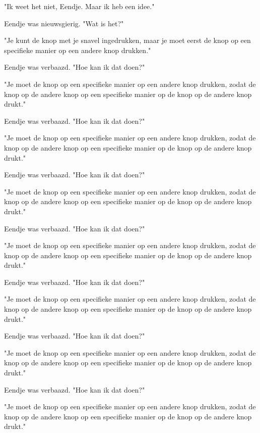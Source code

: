 \documentclass[10pt]{article}
\begin{document}
{\begin{minipage}{\textwidth}
\par\smallskip
"Ik weet het niet, Eendje. Maar ik heb een idee."
\par\smallskip
Eendje was nieuwsgierig. "Wat is het?"
\par\smallskip
"Je kunt de knop met je snavel ingedrukken, maar je moet eerst de knop op een specifieke manier op een andere knop drukken."
\par\smallskip
Eendje was verbaazd. "Hoe kan ik dat doen?"
\par\smallskip
"Je moet de knop op een specifieke manier op een andere knop drukken, zodat de knop op de andere knop op een specifieke manier op de knop op de andere knop drukt."
\par\smallskip
Eendje was verbaazd. "Hoe kan ik dat doen?"
\par\smallskip
"Je moet de knop op een specifieke manier op een andere knop drukken, zodat de knop op de andere knop op een specifieke manier op de knop op de andere knop drukt."
\par\smallskip
Eendje was verbaazd. "Hoe kan ik dat doen?"
\par\smallskip
"Je moet de knop op een specifieke manier op een andere knop drukken, zodat de knop op de andere knop op een specifieke manier op de knop op de andere knop drukt."
\par\smallskip
Eendje was verbaazd. "Hoe kan ik dat doen?"
\par\smallskip
"Je moet de knop op een specifieke manier op een andere knop drukken, zodat de knop op de andere knop op een specifieke manier op de knop op de andere knop drukt."
\par\smallskip
Eendje was verbaazd. "Hoe kan ik dat doen?"
\par\smallskip
"Je moet de knop op een specifieke manier op een andere knop drukken, zodat de knop op de andere knop op een specifieke manier op de knop op de andere knop drukt."
\par\smallskip
Eendje was verbaazd. "Hoe kan ik dat doen?"
\par\smallskip
"Je moet de knop op een specifieke manier op een andere knop drukken, zodat de knop op de andere knop op een specifieke manier op de knop op de andere knop drukt."
\par\smallskip
Eendje was verbaazd. "Hoe kan ik dat doen?"
\par\smallskip
"Je moet de knop op een specifieke manier op een andere knop drukken, zodat de knop op de andere knop op een specifieke manier op de knop op de andere knop drukt."

\end{minipage}}
\end{document}
